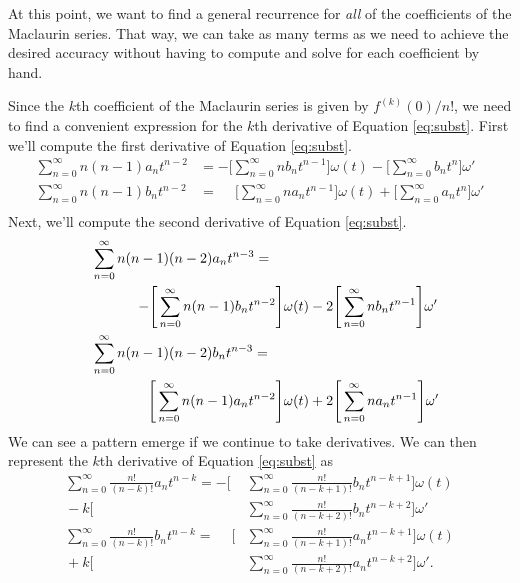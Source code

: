 \documentclass{report}
\begin{document}
At this point, we want to find a general recurrence for \emph{all} of the
coefficients of the Maclaurin series. That way, we can take as many
terms as we need to achieve the desired accuracy without having to
compute and solve for each coefficient by hand.

Since the $k$th coefficient of the Maclaurin series is given by $f^{(k)}(0)/n!$, we need to find a convenient expression for the $k$th derivative of
Equation \ref{eq:subst}.
First we'll compute the first derivative of Equation \ref{eq:subst}.
\begin{equation} \label{eq:diff1}
    \begin{aligned}
    \sum_{n=0}^\infty n(n-1)a_n t^{n-2} &=
        -\Bigg[\sum_{n=0}^\infty nb_n t^{n-1} \Bigg]
            \omega(t)
                - \Bigg[\sum_{n=0}^\infty b_n t^n \Bigg]
                \omega'\\
    \sum_{n=0}^\infty n(n-1)b_n t^{n-2} &=
        \phantom{-}\Bigg[\sum_{n=0}^\infty na_n t^{n-1} \Bigg]
            \omega(t)
                + \Bigg[\sum_{n=0}^\infty a_n t^n \Bigg]
                \omega'\\
    \end{aligned}
\end{equation}
Next, we'll compute the second derivative of Equation \ref{eq:subst}.
\begin{equation} \label{eq:diff2}
    \begin{gathered}
    \shoveleft{\sum_{n=0}^\infty n(n-1)(n-2)a_n t^{n-3} =}\\
        \qquad\qquad-\Bigg[\sum_{n=0}^\infty n(n-1)b_n t^{n-2} \Bigg]
             \omega(t)
                - 2\Bigg[\sum_{n=0}^\infty n b_n t^{n-1} \Bigg]
                \omega'\\
    \shoveleft{\sum_{n=0}^\infty n(n-1)(n-2)b_n t^{n-3} =}\\
        \qquad\qquad\phantom{-}\Bigg[\sum_{n=0}^\infty n(n-1)a_n t^{n-2} \Bigg]
            \omega(t)
                + 2\Bigg[\sum_{n=0}^\infty n a_n t^{n-1} \Bigg]
                \omega'\\
    \end{gathered}
\end{equation}
We can see a pattern emerge if we continue to take derivatives.
We can then represent the $k$th derivative of Equation \ref{eq:subst} as
\begin{equation} \label{eq:diffk}
    \begin{aligned}
    \sum_{n=0}^\infty \frac{n!}{(n-k)!} a_n t^{n-k} =
        -\Bigg[&\sum_{n=0}^\infty \frac{n!}{(n-k+1)!} b_n t^{n-k+1} \Bigg]
             \omega(t)
                \\
                {}-k\Bigg[&\sum_{n=0}^\infty \frac{n!}{(n-k+2)!} b_n t^{n-k+2} \Bigg]
                \omega'\\
    \sum_{n=0}^\infty \frac{n!}{(n-k)!} b_n t^{n-k} =
        \phantom{-}\Bigg[&\sum_{n=0}^\infty \frac{n!}{(n-k+1)!} a_n t^{n-k+1} \Bigg]
             \omega(t)
                \\
                {}+ k\Bigg[&\sum_{n=0}^\infty \frac{n!}{(n-k+2)!} a_n t^{n-k+2} \Bigg]
                \omega'.\\
    \end{aligned}
\end{equation}
\end{document}
